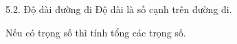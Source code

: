 \documentclass{beamer}
\begin{document}
\begin{frame}{5.2. Độ dài đường đi}
\Large
Độ dài là số cạnh trên đường đi.

\vspace{0.3cm}
Nếu có trọng số thì tính tổng các trọng số.
\end{frame}
\end{document}
